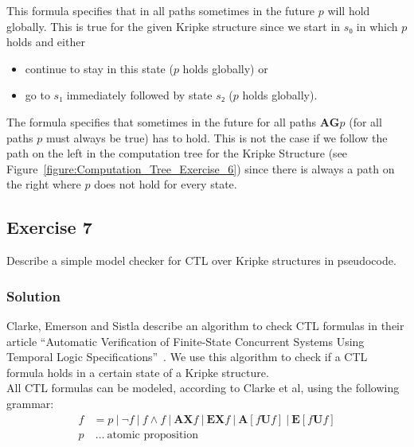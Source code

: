 \documentclass[a4paper, 12pt]{article}
\begin{document}
\begin{description}[style=multiline, leftmargin=3cm]

    \item[$s₀⊧\mathbf{AF}(\mathbf{G} p)$] This formula specifies that in all
    paths sometimes in the future $p$ will hold globally. This is true for the
    given Kripke structure since we start in $s₀$ in which $p$ holds and either

        \begin{itemize}

            \item continue to stay in this state ($p$ holds globally) or

            \item go to $s₁$ immediately followed by state $s₂$ ($p$ holds
            globally).

        \end{itemize}

    \item[$s₀⊧\mathbf{AF}(\mathbf{AG} p)$] The formula specifies that
    sometimes in the future for all paths $\mathbf{AG} p$ (for all paths $p$
    must always be true) has to hold. This is not the case if we follow the
    path on the left in the computation tree for the Kripke Structure (see
    Figure~\ref{figure:Computation_Tree_Exercise_6}) since there is always a
    path on the right where $p$ does not hold for every state.

\end{description}

\subsection{Exercise 7}

Describe a simple model checker for CTL over Kripke structures in pseudocode.

\subsubsection{Solution}

Clarke, Emerson and Sistla describe an algorithm to check CTL formulas in
their article “Automatic Verification of Finite-State Concurrent Systems Using
Temporal Logic Specifications”~\cite{Clarke1986AutomaticVerification}. We use
this algorithm to check if a CTL formula holds in a certain state of a Kripke
structure.\\

All CTL formulas can be modeled, according to Clarke et al, using the following
grammar:
\begin{align*}
    f & = p ~|~ ¬f ~|~ f ∧ f ~|~
          \mathbf{AX} f ~|~ \mathbf{EX} f ~|~
          \mathbf{A}[f \mathbf{U} f] ~|~ \mathbf{E}[f \mathbf{U} f]\\
    p & ~…~ \text{atomic proposition}
\end{align*}
\end{document}
